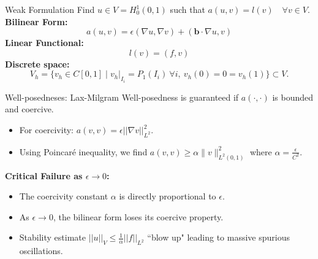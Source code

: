 \documentclass{beamer}
\begin{document}
\begin{frame}{Weak Formulation}
    Find $u \in V = H_0^1(0,1)$ such that $a(u,v) = l(v) \quad \forall v \in V$.
    \vfill
    \textbf{Bilinear Form:}
    \begin{equation*}
        a(u,v) = \epsilon (\nabla u, \nabla v) + (\textbf{b} \cdot \nabla u, v)
    \end{equation*}
    \textbf{Linear Functional:}
    \begin{equation*}
        l(v) = (f, v)
    \end{equation*}
    \pause
    \textbf{Discrete space:}
    \begin{equation*}
        V_h = \{ v_h \in C[0, 1] \mid v_h|_{I_i} = P_1(I_i) \ \forall i, \ v_h(0) = 0 = v_h(1)\} \subset V.
    \end{equation*}
\end{frame}


\begin{frame}{Well-posedneses: Lax-Milgram}
    Well-posedness is guaranteed if $a(\cdot,\cdot)$ is bounded and coercive.
    \begin{itemize}
        \item For coercivity: $a(v,v) = \epsilon ||\nabla v||^2_{L^2}$.
        \item Using Poincaré inequality, we find $a(v,v) \ge \alpha \|v\|_{L^2(0,1)}^2$ where $\alpha = \frac{\epsilon}{C^2}$.
    \end{itemize}
    \vfill
    \pause
    \textbf{Critical Failure as $\epsilon \to 0$:}
    \begin{itemize}
        \item The coercivity constant $\alpha$ is directly proportional to $\epsilon$.
        \item As $\epsilon \to 0$, the bilinear form loses its coercive property.
        \item Stability estimate $||u||_V \le \frac{1}{\alpha} ||f||_{L^2}$ ``blow up" leading to massive spurious oscillations.
    \end{itemize}
\end{frame}
\end{document}

